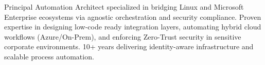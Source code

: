 Principal Automation Architect specialized in bridging Linux and Microsoft Enterprise ecosystems via agnostic orchestration and security compliance. Proven expertise in designing low-code ready integration layers, automating hybrid cloud workflows (Azure/On-Prem), and enforcing Zero-Trust security in sensitive corporate environments. 10+ years delivering identity-aware infrastructure and scalable process automation.